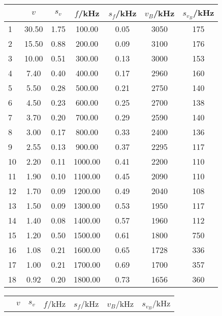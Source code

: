 \begin{center}
    \begin{tabular}{l | c c c c | c c}
        {} &      $v$ &   $s_v$ &   $f$/kHz &   $s_f$/kHz &  $v_B$/kHz &  $s_{v_B}$/kHz \\
        \hline
        1  &  30.50 &  1.75 &   100.00 &  0.05 &   3050 &   175 \\ 
        2  &  15.50 &  0.88 &   200.00 &  0.09 &   3100 &   176 \\ 
        3  &  10.00 &  0.51 &   300.00 &  0.13 &   3000 &   153 \\ 
        4  &   7.40 &  0.40 &   400.00 &  0.17 &   2960 &   160 \\ 
        5  &   5.50 &  0.28 &   500.00 &  0.21 &   2750 &   140 \\ 
        6  &   4.50 &  0.23 &   600.00 &  0.25 &   2700 &   138 \\ 
        7  &   3.70 &  0.20 &   700.00 &  0.29 &   2590 &   140 \\ 
        8  &   3.00 &  0.17 &   800.00 &  0.33 &   2400 &   136 \\ 
        9  &   2.55 &  0.13 &   900.00 &  0.37 &   2295 &   117 \\ 
        10 &   2.20 &  0.11 &  1000.00 &  0.41 &   2200 &   110 \\ 
        11 &   1.90 &  0.10 &  1100.00 &  0.45 &   2090 &   110 \\ 
        12 &   1.70 &  0.09 &  1200.00 &  0.49 &   2040 &   108 \\ 
        13 &   1.50 &  0.09 &  1300.00 &  0.53 &   1950 &   117 \\ 
        14 &   1.40 &  0.08 &  1400.00 &  0.57 &   1960 &   112 \\ 
        15 &   1.20 &  0.50 &  1500.00 &  0.61 &   1800 &   750 \\ 
        16 &   1.08 &  0.21 &  1600.00 &  0.65 &   1728 &   336 \\ 
        17 &   1.00 &  0.21 &  1700.00 &  0.69 &   1700 &   357 \\ 
        18 &   0.92 &  0.20 &  1800.00 &  0.73 &   1656 &   360 \\ 
    \end{tabular}
    \label{tab:vB1}
    \begin{tabular}{l | c c c c | c c}
        {} &      $v$ &   $s_v$ &   $f$/kHz &   $s_f$/kHz &  $v_B$/kHz &  $s_{v_B}$/kHz \\

\end{tabular}
\end{center}
